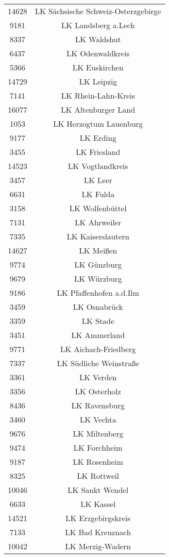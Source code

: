 \begin{tabular}{c c}
    14628&LK Sächsische Schweiz-Osterzgebirge\\ 
    9181&LK Landsberg a.Lech\\ 
    8337&LK Waldshut\\ 
    6437&LK Odenwaldkreis\\ 
    5366&LK Euskirchen\\ 
    14729&LK Leipzig\\ 
    7141&LK Rhein-Lahn-Kreis\\ 
    16077&LK Altenburger Land\\ 
    1053&LK Herzogtum Lauenburg\\ 
    9177&LK Erding\\ 
    3455&LK Friesland\\ 
    14523&LK Vogtlandkreis\\ 
    3457&LK Leer\\ 
    6631&LK Fulda\\ 
    3158&LK Wolfenbüttel\\ 
    7131&LK Ahrweiler\\ 
    7335&LK Kaiserslautern\\ 
    14627&LK Meißen\\ 
    9774&LK Günzburg\\ 
    9679&LK Würzburg\\ 
    9186&LK Pfaffenhofen a.d.Ilm\\ 
    3459&LK Osnabrück\\ 
    3359&LK Stade\\ 
    3451&LK Ammerland\\ 
    9771&LK Aichach-Friedberg\\ 
    7337&LK Südliche Weinstraße\\ 
    3361&LK Verden\\ 
    3356&LK Osterholz\\ 
    8436&LK Ravensburg\\ 
    3460&LK Vechta\\ 
    9676&LK Miltenberg\\ 
    9474&LK Forchheim\\ 
    9187&LK Rosenheim\\ 
    8325&LK Rottweil\\ 
    10046&LK Sankt Wendel\\ 
    6633&LK Kassel\\ 
    14521&LK Erzgebirgskreis\\ 
    7133&LK Bad Kreuznach\\ 
    10042&LK Merzig-Wadern\\ 

\end{tabular}
